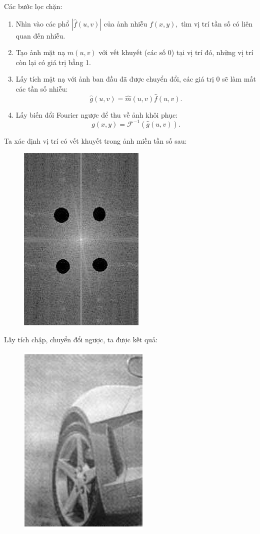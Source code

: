 \documentclass[12pt,a4paper]{report}
\numberwithin{equation}{section}
\theoremstyle{definition} %
\begin{document}
Các bước lọc chặn:
\begin{enumerate}
    \item Nhìn vào các phổ $|\hat{f}(u,v)|$ của ảnh nhiễu $f(x,y),$ tìm vị trí tần số có liên quan đến nhiễu.
    \item Tạo ảnh mặt nạ $\widehat{m}(u,v)$ với vết khuyết (các số 0) tại vị trí đó, những vị trí còn lại có giá trị bằng 1.
    \item Lấy tích mặt nạ với ảnh ban đầu đã được chuyển đổi, các giá trị 0 sẽ làm mất các tần số nhiễu:
    $$\hat{g}(u,v)=\widehat{m}(u,v)\hat{f}(u,v).$$
    \item Lấy biến đổi Fourier ngược để thu về ảnh khôi phục:
    $$g(x,y)=\mathcal{F}^{-1}\left(\hat{g}(u,v)\right).$$

   
    
\end{enumerate}
 Ta xác định vị trí có vết khuyết trong ảnh miền tần số sau:
\begin{figure}[H]
\centering
\includegraphics[width=0.4\linewidth]{img/locChan/Anhdiemchamden.png} 
\end{figure}

    Lấy tích chập, chuyển đổi ngược, ta được kết quả:
\begin{figure}[H]
\centering
\includegraphics[width=0.4\linewidth]{img/locChan/AnhXehoisaulocchan.png}
\end{figure}
\end{document}
